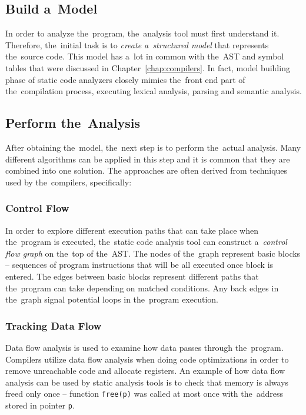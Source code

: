 \documentclass[
  digital, %
  table,   %
  lof,     %
  lot,     %
  oneside,
]{fithesis3}
\begin{document}
\subsection{Build a~Model}
In order to analyze the~program, the~analysis tool must first understand it. Therefore, the~initial task is to \textit{create a~structured model} that represents the~source code. This model has a~lot in common with the~AST and symbol tables that were discussed in Chapter~\ref{chap:compilers}. In fact, model building phase of static code analyzers closely mimics the~front end part of the~compilation process, executing lexical analysis, parsing and semantic analysis.

\subsection{Perform the~Analysis}
After obtaining the~model, the~next step is to perform the~actual analysis. Many different algorithms can be applied in this step and it is common that they are combined into one solution. The approaches are often derived from techniques used by the~compilers, specifically:

\subsubsection{\textbf{Control Flow}}
In order to explore different execution paths that can take place when the~program is executed, the~static code analysis tool can construct a~\textit{control flow graph} on the~top of the~AST. The nodes of the~graph represent basic blocks -- sequences of program instructions that will be all executed once block is entered. The edges between basic blocks represent different paths that the~program can take depending on matched conditions. Any back edges in the~graph signal potential loops in the~program execution.

\subsubsection{\textbf{Tracking Data Flow}}
Data flow analysis is used to examine how data passes through the~program. Compilers utilize data flow analysis when doing code optimizations in order to remove unreachable code and allocate registers. An example of how data flow analysis can be used by static analysis tools is to check that memory is always freed only once -- function \texttt{free(p)} was called at most once with the~address stored in pointer \texttt{p}.
\end{document}
